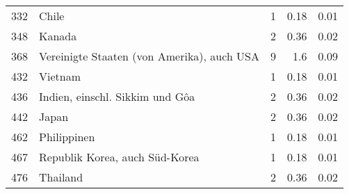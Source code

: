 \begin{longtable}{lXrrr}
        332 & \multicolumn{1}{X}{Chile} & %
          \num{1} &
          \num[round-mode=places,round-precision=2]{0,18} &
          \num[round-mode=places,round-precision=2]{0,01} \\

        348 & \multicolumn{1}{X}{Kanada} & %
          \num{2} &
          \num[round-mode=places,round-precision=2]{0,36} &
          \num[round-mode=places,round-precision=2]{0,02} \\

        368 & \multicolumn{1}{X}{Vereinigte Staaten (von Amerika), auch USA} & %
          \num{9} &
          \num[round-mode=places,round-precision=2]{1,6} &
          \num[round-mode=places,round-precision=2]{0,09} \\

        432 & \multicolumn{1}{X}{Vietnam} & %
          \num{1} &
          \num[round-mode=places,round-precision=2]{0,18} &
          \num[round-mode=places,round-precision=2]{0,01} \\

        436 & \multicolumn{1}{X}{Indien, einschl. Sikkim und Gôa} & %
          \num{2} &
          \num[round-mode=places,round-precision=2]{0,36} &
          \num[round-mode=places,round-precision=2]{0,02} \\

        442 & \multicolumn{1}{X}{Japan} & %
          \num{2} &
          \num[round-mode=places,round-precision=2]{0,36} &
          \num[round-mode=places,round-precision=2]{0,02} \\

        462 & \multicolumn{1}{X}{Philippinen} & %
          \num{1} &
          \num[round-mode=places,round-precision=2]{0,18} &
          \num[round-mode=places,round-precision=2]{0,01} \\

        467 & \multicolumn{1}{X}{Republik Korea, auch Süd-Korea} & %
          \num{1} &
          \num[round-mode=places,round-precision=2]{0,18} &
          \num[round-mode=places,round-precision=2]{0,01} \\

        476 & \multicolumn{1}{X}{Thailand} & %
          \num{2} &
          \num[round-mode=places,round-precision=2]{0,36} &
          \num[round-mode=places,round-precision=2]{0,02} \\


\end{longtable}
